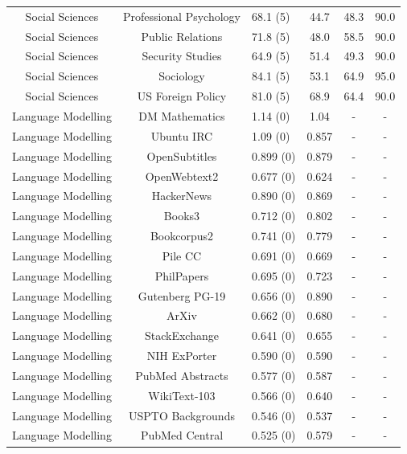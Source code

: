 \documentclass[11pt, a4paper, logo, internal, copyright, nonumbering]{deepmind}
\begin{document}
\begin{center}
\begin{longtable}{cclccc}
        Social Sciences &              Professional Psychology &   68.1 (5) &  44.7 &  48.3 &         90.0 \\
        Social Sciences &                     Public Relations &   71.8 (5) &  48.0 &  58.5 &         90.0 \\
        Social Sciences &                     Security Studies &   64.9 (5) &  51.4 &  49.3 &         90.0 \\
        Social Sciences &                            Sociology &   84.1 (5) &  53.1 &  64.9 &         95.0 \\
        Social Sciences &                    US Foreign Policy &   81.0 (5) &  68.9 &  64.4 &         90.0 \\
Language Modelling & DM Mathematics    &  1.14 (0) &  1.04 &  - & -  \\
Language Modelling & Ubuntu IRC        &  1.09 (0) &  0.857 &   - & -\\
Language Modelling & OpenSubtitles     &  0.899 (0) &  0.879 &   - & - \\
Language Modelling & OpenWebtext2     &  0.677 (0) &   0.624 &  - & -\\
Language Modelling & HackerNews        &  0.890 (0) &  0.869 &   - & - \\
Language Modelling & Books3            &  0.712 (0) &  0.802 &  - & -\\
Language Modelling & Bookcorpus2       &  0.741 (0) & 0.779 &  - & -\\
Language Modelling & Pile CC           &  0.691 (0) & 0.669 &   - & -\\
Language Modelling & PhilPapers        &  0.695 (0) &  0.723 &  - & -\\
Language Modelling & Gutenberg PG-19   &  0.656 (0) &  0.890 &  - & -\\
Language Modelling & ArXiv             &  0.662 (0) &  0.680 &   - & -\\
Language Modelling & StackExchange     &  0.641 (0) &  0.655 &   - & -\\
Language Modelling & NIH ExPorter      &  0.590 (0) &  0.590 &   - & -\\
Language Modelling & PubMed Abstracts  &  0.577 (0) &  0.587 &  - & -\\
Language Modelling & WikiText-103      &  0.566 (0) &  0.640 &  - & - \\
Language Modelling & USPTO Backgrounds &  0.546 (0) &  0.537 &  - & - \\
Language Modelling & PubMed Central    &  0.525 (0) &  0.579 &  - & - \\

\end{longtable}
\end{center}
\end{document}
